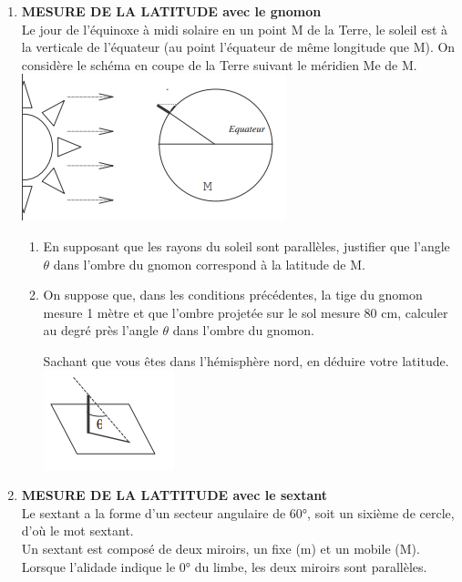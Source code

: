 \begin{multicols}{2}
\begin{enumerate}
\begin{enumerate}
\begin{enumerate}
	\end{enumerate}
\end{enumerate}
\item \textbf{MESURE DE LA LATITUDE avec le gnomon}\\

Le jour de l'équinoxe à midi solaire en un point M de la Terre, le
soleil est à la verticale de l'équateur (au point l'équateur de même
longitude que M).
On considère le schéma en coupe de la Terre suivant le méridien Me
de M.\\

\includegraphics[scale=1]{RepE-schemacoupeterre.png}

\begin{enumerate}
\item En supposant que les rayons du soleil sont parallèles,
justifier que l'angle $\theta$ dans l'ombre du gnomon correspond à la
latitude de M.
\item On suppose que, dans les conditions précédentes, la tige du gnomon mesure 1 mètre
et que l'ombre projetée sur le sol mesure 80 cm, calculer au degré près l'angle $\theta$ dans
l'ombre du gnomon.

Sachant que vous êtes dans l'hémisphère nord, en déduire votre latitude.\\
\includegraphics[scale=1]{RepE-angleteta.png}


\end{enumerate}
\item \textbf{MESURE DE LA LATTITUDE avec le sextant}\\

Le sextant a la forme d'un secteur angulaire de $60°$, soit un sixième de cercle, d'où le mot sextant.\\
Un sextant est composé de deux miroirs, un fixe (m) et un mobile (M). Lorsque l'alidade indique le $0°$ du limbe, les deux miroirs sont parallèles.


\end{enumerate}
\end{multicols}
